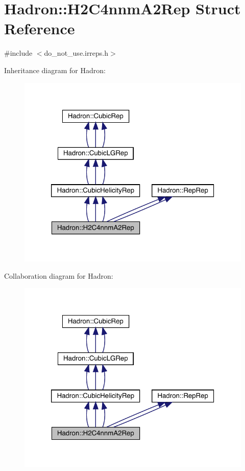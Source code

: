 \hypertarget{structHadron_1_1H2C4nnmA2Rep}{}\section{Hadron\+:\+:H2\+C4nnm\+A2\+Rep Struct Reference}
\label{structHadron_1_1H2C4nnmA2Rep}


{\ttfamily \#include $<$do\+\_\+not\+\_\+use.\+irreps.\+h$>$}



Inheritance diagram for Hadron\+:
\nopagebreak
\begin{figure}[H]
\begin{center}
\leavevmode
\includegraphics[width=320pt]{d0/deb/structHadron_1_1H2C4nnmA2Rep__inherit__graph}
\end{center}
\end{figure}


Collaboration diagram for Hadron\+:
\nopagebreak
\begin{figure}[H]
\begin{center}
\leavevmode
\includegraphics[width=320pt]{d7/d46/structHadron_1_1H2C4nnmA2Rep__coll__graph}
\end{center}
\end{figure}

